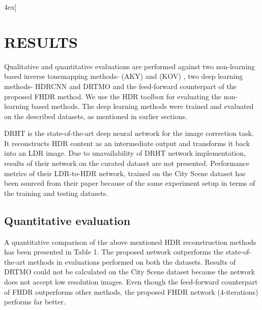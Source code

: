\documentclass[conference]{IEEEtran}
\begin{document}
\begin{figure*}\centering
    \-4ex]

\section{RESULTS}
Qualitative and quantitative evaluations are performed against two non-learning based inverse tonemapping methods- (AKY) \cite{akyuz2007hdr} and (KOV) \cite{kovaleski2014high}, two deep learning methods- HDRCNN \cite{eilertsen2017hdr} and DRTMO \cite{endo2017deep} and the feed-forward counterpart of the proposed FHDR method. We use the HDR toolbox \cite{banterle2017advanced} for evaluating the non-learning based methods. 
The deep learning methods were trained and evaluated on the described datasets, as mentioned in earlier sections. 

DRHT \cite{yang2018image} is the state-of-the-art deep neural network for the image correction task. It reconstructs HDR content as an intermediate output and transforms it back into an LDR image. Due to unavailability of DRHT network implementation, results of their network on the curated dataset are not presented. Performance metrics of their LDR-to-HDR network, trained on the City Scene dataset has been sourced from their paper because of the same experiment setup in terms of the training and testing datasets.



\subsection{Quantitative evaluation}
A quantitative comparison of the above mentioned HDR reconstruction methods has been presented in Table 1. The proposed network outperforms the state-of-the-art methods in evaluations performed on both the datasets. Results of DRTMO \cite{endo2017deep} could not be calculated on the City Scene dataset because the network does not accept low resolution images. Even though the feed-forward counterpart of FHDR outperforms other methods, the proposed FHDR network (4-iterations) performs far better.


\end{figure*}
\end{document}
